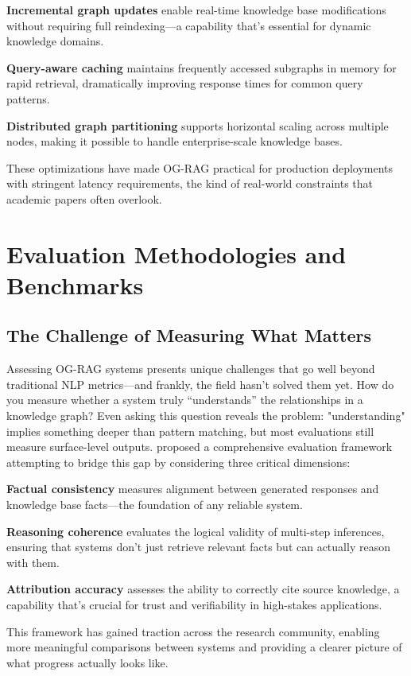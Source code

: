 \textbf{Incremental graph updates} enable real-time knowledge base modifications without requiring full reindexing—a capability that's essential for dynamic knowledge domains.

\textbf{Query-aware caching} maintains frequently accessed subgraphs in memory for rapid retrieval, dramatically improving response times for common query patterns.

\textbf{Distributed graph partitioning} supports horizontal scaling across multiple nodes, making it possible to handle enterprise-scale knowledge bases.

These optimizations have made OG-RAG practical for production deployments with stringent latency requirements, the kind of real-world constraints that academic papers often overlook.

\section{Evaluation Methodologies and Benchmarks}

\subsection{The Challenge of Measuring What Matters}

Assessing OG-RAG systems presents unique challenges that go well beyond traditional NLP metrics—and frankly, the field hasn't solved them yet. How do you measure whether a system truly ``understands'' the relationships in a knowledge graph? Even asking this question reveals the problem: "understanding" implies something deeper than pattern matching, but most evaluations still measure surface-level outputs. \citet{chen2024comprehensive} proposed a comprehensive evaluation framework attempting to bridge this gap by considering three critical dimensions:

\textbf{Factual consistency} measures alignment between generated responses and knowledge base facts—the foundation of any reliable system.

\textbf{Reasoning coherence} evaluates the logical validity of multi-step inferences, ensuring that systems don't just retrieve relevant facts but can actually reason with them.

\textbf{Attribution accuracy} assesses the ability to correctly cite source knowledge, a capability that's crucial for trust and verifiability in high-stakes applications.

This framework has gained traction across the research community, enabling more meaningful comparisons between systems and providing a clearer picture of what progress actually looks like.

